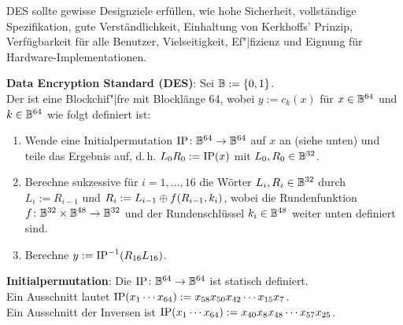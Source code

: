 DES sollte gewisse Designziele erfüllen,
wie hohe Sicherheit,
vollständige Spezifikation,
gute Verständlichkeit,
Einhaltung von Kerkhoffs' Prinzip,
Verfügbarkeit für alle Benutzer,
Vielseitigkeit,
Ef"|fizienz und
Eignung für Hardware-Implementationen.

\textbf{Data Encryption Standard (DES)}:
Sei $\mathbb{B} := \{0, 1\}$.\\
Der  ist eine Blockchif"|fre mit Blocklänge 64,
wobei $y := c_k(x)$ für $x \in \mathbb{B}^{64}$ und $k \in \mathbb{B}^{64}$ wie folgt definiert ist:
\begin{enumerate}
    \item
    Wende eine Initialpermutation $\operatorname{IP}\colon \mathbb{B}^{64} \rightarrow \mathbb{B}^{64}$ auf $x$ an
    (siehe unten) und teile das Ergebnis auf, d.\,h.
    $L_0 R_0 := \operatorname{IP}(x)$ mit $L_0, R_0 \in \mathbb{B}^{32}$.
    
    \item
    Berechne sukzessive für $i = 1, \dotsc, 16$ die Wörter $L_i, R_i \in \mathbb{B}^{32}$ durch\\
    $L_i := R_{i-1}$ und $R_i := L_{i-1} \oplus f(R_{i-1}, k_i)$,
    wobei die Rundenfunktion $f\colon \mathbb{B}^{32} \times \mathbb{B}^{48} \rightarrow \mathbb{B}^{32}$
    und der Rundenschlüssel $k_i \in \mathbb{B}^{48}$ weiter unten definiert sind.
    
    \item
    Berechne $y := \operatorname{IP}^{-1}(R_{16} L_{16})$.
\end{enumerate}

\linie
\pagebreak

\textbf{Initialpermutation}:
Die  $\operatorname{IP}\colon \mathbb{B}^{64} \rightarrow \mathbb{B}^{64}$ ist statisch
definiert.\\
Ein Ausschnitt lautet $\operatorname{IP}(x_1 \cdots x_{64}) := x_{58} x_{50} x_{42} \cdots x_{15} x_7$.\\
Ein Ausschnitt der Inversen ist $\operatorname{IP}(x_1 \cdots x_{64}) := x_{40} x_8 x_{48} \cdots x_{57} x_{25}$.

